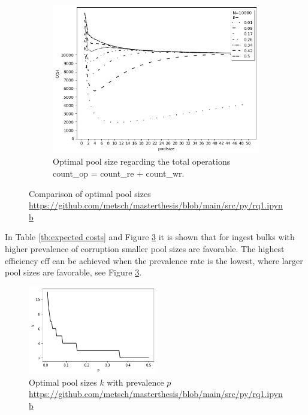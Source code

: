 \begin{figure}[H]
\begin{subfigure}{6cm}
        \includegraphics[width=\linewidth]{graphics/expected_operations.png}
        \caption{Optimal pool size regarding the total operations \acrshort{count_op} = \acrshort{count_re} + \acrshort{count_wr}.}\label{fig:expected_operations}
    \end{subfigure}
    \caption{Comparison of optimal pool sizes \url{https://github.com/metsch/masterthesis/blob/main/src/py/rq1.ipynb}}%
    \label{fig:optimal_pool_size}%
\end{figure}
In Table \ref{tb:expected costs} and Figure \ref{fig:poolsizes} it is shown that for ingest bulks with higher prevalence of corruption smaller pool sizes are favorable.
The highest efficiency \acrshort{eff} can be achieved when the prevalence rate is the lowest, where larger pool sizes are favorable, see Figure \ref{fig:poolsizes}.
\begin{figure}[H]%
    \centering
    \caption{Optimal pool sizes $k$ with prevalence $p$ \url{https://github.com/metsch/masterthesis/blob/main/src/py/rq1.ipynb}}\label{fig:pool-sizes}
    \label{fig:poolsizes}
    \includegraphics[width=0.5\textwidth]{graphics/poolsizes.png}
\end{figure}
